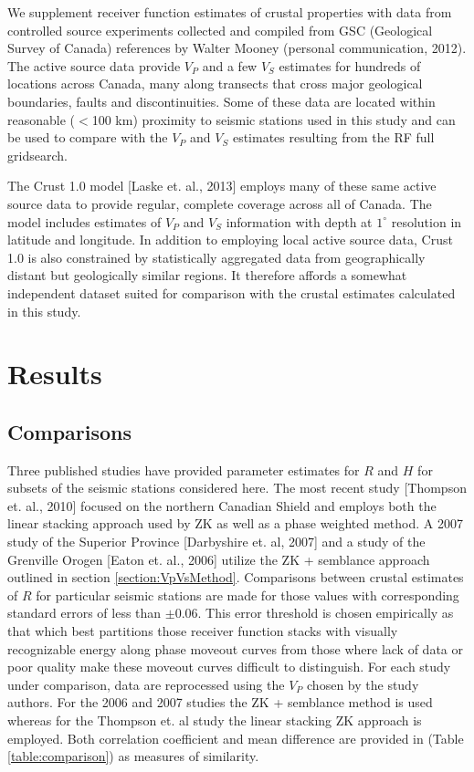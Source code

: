 \documentclass[draft, 12pt]{article}
\begin{document}
We supplement receiver function estimates of crustal properties with data from controlled source experiments collected and compiled from GSC (Geological Survey of Canada) references by Walter Mooney (personal communication, 2012). The active source data provide $V_P$ and a few $V_S$ estimates for hundreds of locations across Canada, many along transects that cross major geological boundaries, faults and discontinuities. Some of these data are located within reasonable ($<$100 km) proximity to seismic stations used in this study and can be used to compare with the $V_P$ and $V_S$ estimates resulting from the RF full gridsearch.

The Crust 1.0 model [Laske et. al., 2013] employs many of these same active source data to provide regular, complete coverage across all of Canada. The model includes estimates of $V_P$ and $V_S$ information with depth at $1^\circ$ resolution in latitude and longitude. In addition to employing local active source data, Crust 1.0 is also constrained by statistically aggregated data from geographically distant but geologically similar regions. It therefore affords a somewhat independent dataset suited for comparison with the crustal estimates calculated in this study.

\section{Results}

\subsection{Comparisons}

Three published studies have provided parameter estimates for $R$ and $H$ for subsets of the seismic stations considered here. The most recent study [Thompson et. al., 2010] focused on the northern Canadian Shield and employs both the linear stacking approach used by ZK as well as a phase weighted method. A 2007 study of the Superior Province [Darbyshire et. al, 2007] and a study of the Grenville Orogen [Eaton et. al., 2006] utilize the ZK + semblance approach outlined in section \ref{section:VpVsMethod}.  Comparisons between crustal estimates of $R$ for particular seismic stations are made for those values with corresponding standard errors of less than $\pm$0.06. This error threshold is chosen empirically as that which best partitions those receiver function stacks with visually recognizable energy along phase moveout curves from those where lack of data or poor quality make these moveout curves difficult to distinguish. For each study under comparison, data are reprocessed using the $V_P$ chosen by the study authors. For the 2006 and 2007 studies the ZK + semblance method is used whereas for the Thompson et. al study the linear stacking ZK approach is employed. Both correlation coefficient and mean difference are provided in (Table \ref{table:comparison}) as measures of similarity.
\end{document}
